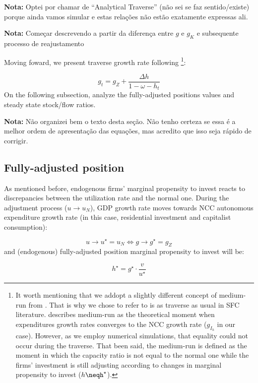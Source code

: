 \documentclass[11pt]{article}
\begin{document}
\textbf{Nota:} Optei por chamar de ``Analytical Traverse'' (não sei se faz sentido/existe) porque ainda vamos simular e estas relações não estão exatamente expressas ali.

\textbf{Nota:} Começar descrevendo a partir da diferença entre \(g\) e \(g_K\) e subsequente processo de reajustamento

Moving foward, we present traverse growth rate following \textcite{freitas_growth_2015}\footnote{It worth mentioning that we addopt a slightly different concept of medium-run from \textcite{freitas_growth_2015}. That is why we chose to refer to is as traverse as usual in SFC literature. \textcite{freitas_growth_2015} describes medium-run as the theoretical moment when expenditures growth rates converges to the NCC growth rate (\(g_{I_h}\) in our case). However, as we employ numerical simulations, that equality could not occur during the traverse. That been said, the medium-run is defined as the moment in which the capacity ratio is not equal to the normal one while the firms' investment is still adjusting according to changes in marginal propensity to invest (\(h\neqh^\star\)).}:

\begin{equation}
\label{g_short}
g_t = g_{Z} + \frac{\Delta h}{1 - \omega - h_{t}}
\end{equation}
On the following subsection, analyze the fully-adjusted positions values and steady state stock/flow ratios.


\textbf{Nota:} Não organizei bem o texto desta seção. Não tenho certeza se essa é a melhor ordem de apresentação das equações, mas acredito que isso seja rápido de corrigir.

\subsection{Fully-adjusted position}
\label{sec:org72922f9}
\label{long}


As mentioned before, endogenous firms’ marginal propensity to invest reacts to discrepancies between the utilization rate and the normal one.  During the adjustment process (\(u\to u_N\)), GDP growth rate moves towards NCC autonomous expenditure growth rate (in this case, residential investment and capitalist consumption):

$$
u \to u^{\star}  = u_N \Leftrightarrow g \to g^{\star} = g_Z
$$
and (endogenous) fully-adjusted position marginal propensity to invest will be:


\begin{equation}
\label{h_long}
h^{\star} = g^{\star}\cdot \frac{v}{u^{\star}}
\end{equation}
\end{document}
